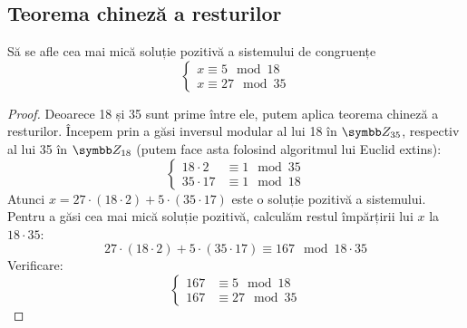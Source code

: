 \subsection{Teorema chineză a resturilor}

\begin{exercise}[4.1]
Să se afle cea mai mică soluție pozitivă a sistemului de congruențe
\[
\begin{cases}
    x \equiv 5 \mod{18} \\
    x \equiv 27 \mod{35}
\end{cases}
\]
\end{exercise}
\begin{proof}
Deoarece 18 și 35 sunt prime între ele, putem aplica teorema chineză a resturilor.
Începem prin a găsi inversul modular al lui 18 în \(\integersmod{35}\), respectiv al lui 35 în \(\integersmod{18}\) (putem face asta folosind algoritmul lui Euclid extins):
\[
\begin{cases}
    18 \cdot 2 &\equiv 1 \mod{35} \\
    35 \cdot 17 &\equiv 1 \mod{18}
\end{cases}
\]
Atunci \(x = 27 \cdot (18 \cdot 2) + 5 \cdot (35 \cdot 17)\) este o soluție pozitivă a sistemului.
Pentru a găsi cea mai mică soluție pozitivă, calculăm restul împărțirii lui \(x\) la \(18 \cdot 35\):
\[
    27 \cdot (18 \cdot 2) + 5 \cdot (35 \cdot 17) \equiv 167 \mod{18 \cdot 35}
\]
Verificare:
\[
\begin{cases}
    167 &\equiv 5 \mod{18} \\
    167 &\equiv 27 \mod{35}
\end{cases}
\]
\end{proof}

